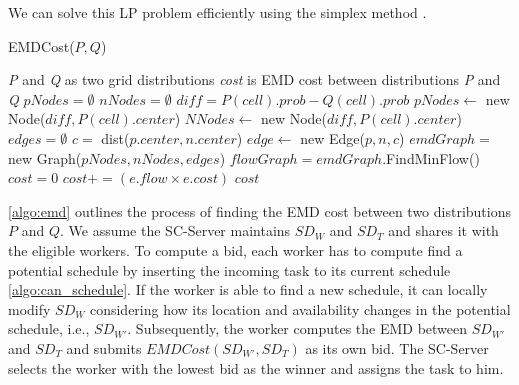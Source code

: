 

\noindent We can solve this LP problem efficiently using the simplex method \cite{Dantzig90}.\\

\begin{algorithm}[h]
\caption{EMDCost($P, Q$)}
\label{algo:emd}
\begin{algorithmic}[1]
\REQUIRE \emph{P} and \emph{Q} as two grid distributions
\ENSURE \emph{cost} is EMD cost between distributions \emph{P} and \emph{Q}
\STATE $pNodes = \emptyset$
\STATE $nNodes = \emptyset$
	\STATE $diff = P(cell).prob - Q(cell).prob$
		\STATE $pNodes \leftarrow$ new Node($diff, P(cell).center$)
	\ELSE
		\STATE $NNodes \leftarrow$ new Node($diff, P(cell).center$)
	\ENDIF
\ENDFOR
\STATE $edges = \emptyset$
		\STATE $c =$ dist($p.center, n.center$)
		\STATE $edge \leftarrow$ new Edge($p, n, c$)
	\ENDFOR
\ENDFOR
\STATE $emdGraph =$ new Graph($pNodes, nNodes, edges$)
\STATE $flowGraph = emdGraph$.FindMinFlow()
\STATE $cost = 0$
	\STATE $cost += (e.flow \times e.cost)$
\ENDFOR
\RETURN $cost$
\end{algorithmic}
\end{algorithm}

\cref{algo:emd} outlines the process of finding the EMD cost between two distributions $P$ and $Q$. We assume the SC-Server maintains $SD_W$ and $SD_T$ and shares it with the eligible workers. To compute a bid, each worker has to compute find a potential schedule by inserting the incoming task to its current schedule \cref{algo:can_schedule}. If the worker is able to find a new schedule, it can locally modify $SD_W$ considering how its location and availability changes in the potential schedule, i.e., $SD_{W'}$. Subsequently, the worker computes the EMD between $SD_{W'}$ and $SD_T$ and submits $EMDCost(SD_{W'}, SD_T)$ as its own bid. The SC-Server selects the worker with the lowest bid as the winner and assigns the task to him.

